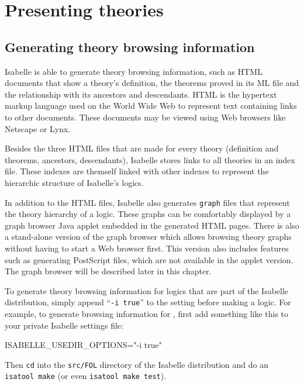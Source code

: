 

\chapter{Presenting theories}

\section{Generating theory browsing information} \label{sec:info}

Isabelle is able to generate theory browsing information, such as HTML
documents that show a theory's definition, the theorems proved in its
ML file and the relationship with its ancestors and descendants. HTML
is the hypertext markup language used on the World Wide Web to
represent text containing links to other documents.  These documents
may be viewed using Web browsers like Netscape or Lynx.

Besides the three HTML files that are made for every theory
(definition and theorems, ancestors, descendants), Isabelle stores
links to all theories in an index file. These indexes are themself
linked with other indexes to represent the hierarchic structure of
Isabelle's logics.

In addition to the HTML files, Isabelle also generates \texttt{graph}
files that represent the theory hierarchy of a logic.  These graphs
can be comfortably displayed by a graph browser Java applet embedded
in the generated HTML pages. There is also a stand-alone version of
the graph browser which allows browsing theory graphs without having
to start a Web browser first. This version also includes features such
as generating {\sc PostScript} files, which are not available in the
applet version. The graph browser will be described later in this
chapter.

\medskip To generate theory browsing information for logics that are
part of the Isabelle distribution, simply append ``\texttt{-i true}''
to the  setting before making a logic.
For example, to generate browsing information for {\FOL}, first add
something like this to your private Isabelle settings file:
\begin{ttbox}
ISABELLE_USEDIR_OPTIONS="-i true"
\end{ttbox}
Then \texttt{cd} into the \texttt{src/FOL} directory of the Isabelle
distribution and do an \texttt{isatool make} (or even \texttt{isatool
  make test}).

